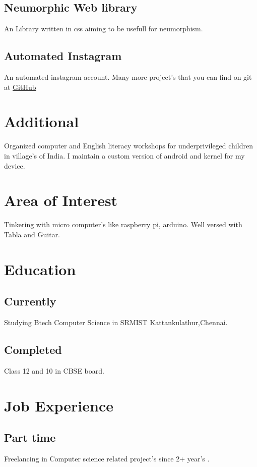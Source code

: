 \documentclass{article}
\begin{document}
\subsection{Neumorphic Web library }
An Library written in css aiming to be usefull for neumorphism.

\subsection{Automated Instagram }
An automated instagram account.
Many more project's that you can find on git at \href{https://github.com/abhishrijoshi}{\underline{GitHub}}
 

\section{Additional}
Organized computer and English literacy workshops for underprivileged children in village's of India.
\hfill \break
I maintain a custom version of android and kernel for my device.

\section{Area of Interest}
Tinkering with micro computer's like raspberry pi, arduino. 
\hfill \break
Well versed with Tabla and Guitar.
\section{Education}
\subsection{Currently}
Studying Btech Computer Science in SRMIST Kattankulathur,Chennai.

\subsection{Completed} Class 12 and 10 in CBSE board.
\section{Job Experience}
\subsection{Part time }Freelancing in Computer science related project's since 2+ year's .
\end{document}
